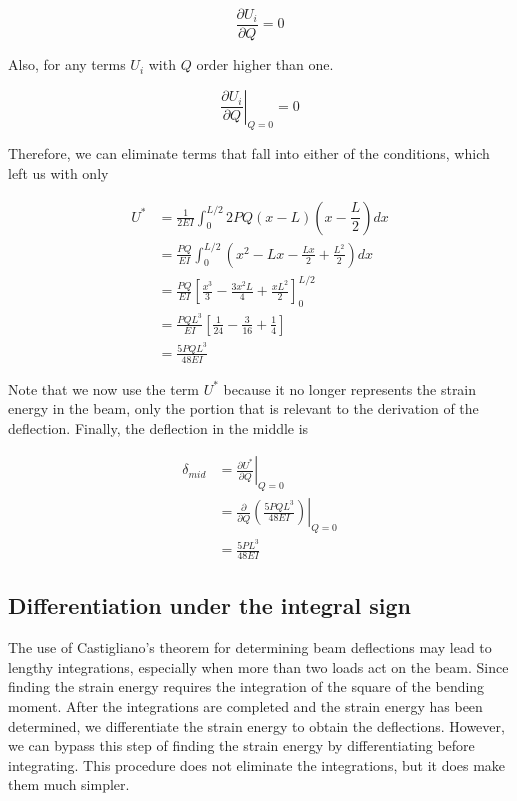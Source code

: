 \documentclass[
10pt,
a4paper,
openany,
svgnames,
]{book} %
\begin{document}
\begin{solution}
    \begin{equation*}
      \frac{\partial U_i}{\partial Q} = 0
    \end{equation*}

    Also, for any terms $U_i$ with $Q$ order higher than one.

    \begin{equation*}
      \left. \frac{\partial U_i}{\partial Q} \right|_{Q=0} = 0
    \end{equation*}

    Therefore, we can eliminate terms that fall into either of the conditions, which left us with only

    \begin{align*}
      U^* &= \frac{1}{2EI} \int_0^{L/2} 2PQ(x-L)(x-\dfrac{L}{2}) dx \\
          &= \frac{PQ}{EI} \int_0^{L/2} (x^2 - Lx - \frac{Lx}{2} + \frac{L^2}{2}) dx \\
          &= \frac{PQ}{EI} \left[ \frac{x^3}{3} - \frac{3x^2L}{4} + \frac{xL^2}{2} \right]_0^{L/2} \\
          &= \frac{PQL^3}{EI} \left[ \frac{1}{24} - \frac{3}{16} + \frac{1}{4} \right] \\
          &= \frac{5PQL^3}{48EI}
    \end{align*}

    Note that we now use the term $U^*$ because it no longer represents the strain energy in the beam, only the portion that is relevant to the derivation of the deflection. Finally, the deflection in the middle is

    \begin{align*}
      \delta_{mid} &= \left. \frac{\partial U^*}{\partial Q} \right|_{Q=0} \\
                   &= \left. \frac{\partial}{\partial Q} \left( \frac{5PQL^3}{48EI} \right) \right|_{Q=0} \\
                   &= \frac{5PL^3}{48EI}
    \end{align*}
\end{solution}
\subsection{Differentiation under the integral sign}

The use of Castigliano’s theorem for determining beam deflections may lead to lengthy integrations, especially when more than two loads act on the beam. Since finding the strain energy requires the integration of the square of the bending moment. After the integrations are completed and the strain energy has been determined, we differentiate the strain energy to obtain the deflections. However, we can bypass this step of finding the strain energy by differentiating before integrating. This procedure does not eliminate the integrations, but it does make them much simpler.
\end{document}
